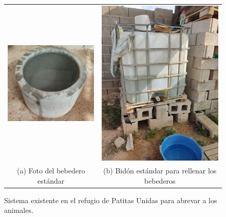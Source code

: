 \documentclass[12pt]{article}
\begin{document}
	\begin{figure}[h!]
		\begin{center}
			\begin{tabular}{cc}
				\includegraphics[width=55mm]{img/bebedero_refugio.jpg} &   \includegraphics[width=60mm]{img/bidon_refugio.jpg} \\
				(a) Foto del bebedero estándar & (b) Bidón estándar para rellenar los bebederos\\[6pt]
			\end{tabular}
			\caption{Sistema existente en el refugio de Patitas Unidas para abrevar a los animales. }
			\label{fig: sistema bebedero refugio.}
		\end{center}
	\end{figure}
	
\end{document}
